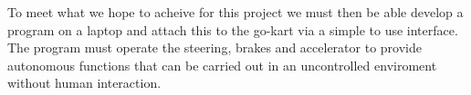 To meet what we hope to acheive for this project we must then be able develop a program on a laptop and attach this to the go-kart via a simple to use interface. The program must operate the steering, brakes and accelerator to provide autonomous functions that can be carried out in an uncontrolled enviroment without human interaction. 

